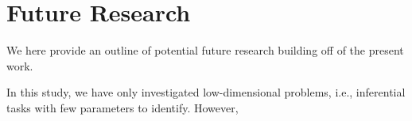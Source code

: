 




\chapter{Future Research}\label{chap:future}


We here provide an outline of potential future research building off of the present work.  

In this study, we have only investigated low-dimensional problems, i.e., inferential tasks with few parameters to identify. However, 

